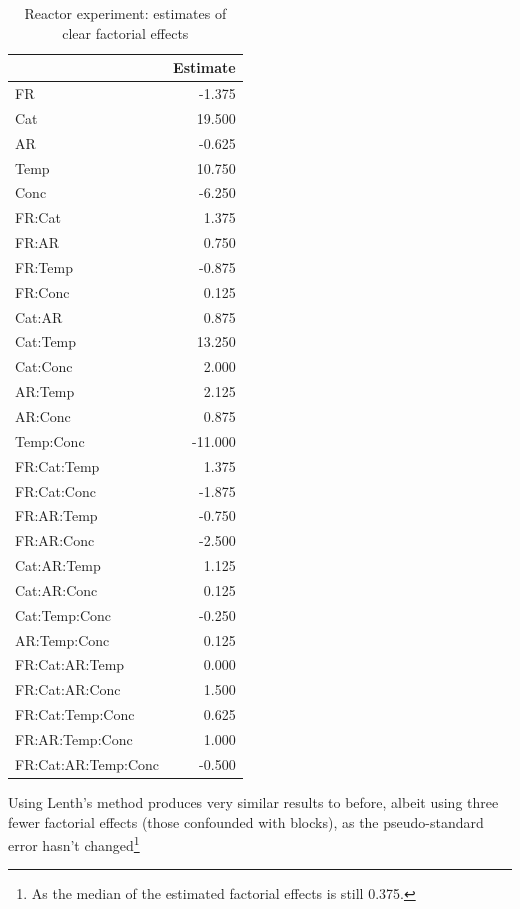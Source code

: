 \documentclass[
]{book}
\theoremstyle{definition}
\theoremstyle{definition}
\theoremstyle{definition}
\theoremstyle{definition}
\theoremstyle{remark}
\begin{document}
\begin{table}

\caption{\label{tab:block-4-fact-effects}Reactor experiment: estimates of clear factorial effects}
\centering
\begin{tabular}[t]{l|r}
\hline
  & Estimate\\
\hline
FR & -1.375\\
\hline
Cat & 19.500\\
\hline
AR & -0.625\\
\hline
Temp & 10.750\\
\hline
Conc & -6.250\\
\hline
FR:Cat & 1.375\\
\hline
FR:AR & 0.750\\
\hline
FR:Temp & -0.875\\
\hline
FR:Conc & 0.125\\
\hline
Cat:AR & 0.875\\
\hline
Cat:Temp & 13.250\\
\hline
Cat:Conc & 2.000\\
\hline
AR:Temp & 2.125\\
\hline
AR:Conc & 0.875\\
\hline
Temp:Conc & -11.000\\
\hline
FR:Cat:Temp & 1.375\\
\hline
FR:Cat:Conc & -1.875\\
\hline
FR:AR:Temp & -0.750\\
\hline
FR:AR:Conc & -2.500\\
\hline
Cat:AR:Temp & 1.125\\
\hline
Cat:AR:Conc & 0.125\\
\hline
Cat:Temp:Conc & -0.250\\
\hline
AR:Temp:Conc & 0.125\\
\hline
FR:Cat:AR:Temp & 0.000\\
\hline
FR:Cat:AR:Conc & 1.500\\
\hline
FR:Cat:Temp:Conc & 0.625\\
\hline
FR:AR:Temp:Conc & 1.000\\
\hline
FR:Cat:AR:Temp:Conc & -0.500\\
\hline
\end{tabular}
\end{table}

Using Lenth's method produces very similar results to before, albeit using three fewer factorial effects (those confounded with blocks), as the pseudo-standard error hasn't changed\footnote{As the median of the estimated factorial effects is still 0.375.}
\end{document}
